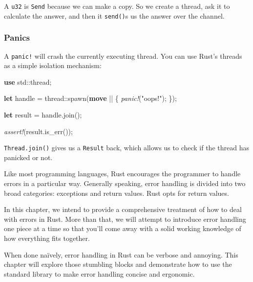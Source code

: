 \documentclass[a4paper,]{book}
\newenvironment{Shaded}{\begin{snugshade}}{\end{snugshade}}
\newcommand{\KeywordTok}[1]{\textcolor[rgb]{0.13,0.29,0.53}{\textbf{{#1}}}}
\newcommand{\StringTok}[1]{\textcolor[rgb]{0.31,0.60,0.02}{{#1}}}
\newcommand{\PreprocessorTok}[1]{\textcolor[rgb]{0.56,0.35,0.01}{\textit{{#1}}}}
\newcommand{\NormalTok}[1]{{#1}}
\begin{document}
A \texttt{u32} is \texttt{Send} because we can make a copy. So we create
a thread, ask it to calculate the answer, and then it \texttt{send()}s
us the answer over the channel.

\subsubsection{Panics}\label{panics}

A \texttt{panic!} will crash the currently executing thread. You can use
Rust's threads as a simple isolation mechanism:

\begin{Shaded}
\begin{Highlighting}[]
\KeywordTok{use} \NormalTok{std::thread;}

\KeywordTok{let} \NormalTok{handle = thread::spawn(}\KeywordTok{move} \NormalTok{|| \{}
    \PreprocessorTok{panic!}\NormalTok{(}\StringTok{"oops!"}\NormalTok{);}
\NormalTok{\});}

\KeywordTok{let} \NormalTok{result = handle.join();}

\PreprocessorTok{assert!}\NormalTok{(result.is_err());}
\end{Highlighting}
\end{Shaded}

\texttt{Thread.join()} gives us a \texttt{Result} back, which allows us
to check if the thread has panicked or not.


Like most programming languages, Rust encourages the programmer to
handle errors in a particular way. Generally speaking, error handling is
divided into two broad categories: exceptions and return values. Rust
opts for return values.

In this chapter, we intend to provide a comprehensive treatment of how
to deal with errors in Rust. More than that, we will attempt to
introduce error handling one piece at a time so that you'll come away
with a solid working knowledge of how everything fits together.

When done naïvely, error handling in Rust can be verbose and annoying.
This chapter will explore those stumbling blocks and demonstrate how to
use the standard library to make error handling concise and ergonomic.
\end{document}
